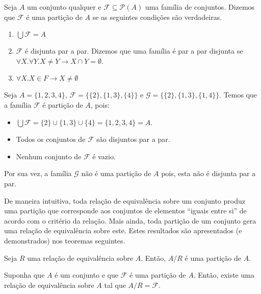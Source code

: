 \begin{Definition}[Partição]
Seja $A$ um conjunto qualquer e $\mathcal{F}\subseteq \mathcal{P}(A)$
uma família de conjuntos. Dizemos que $\mathcal{F}$ é uma partição de
$A$ se as seguintes condições são verdadeiras.
\begin{enumerate}
  \item $\bigcup\mathcal{F} = A$
  \item $\mathcal{F}$ é disjunta par a par. Dizemos que uma família é
    par a par disjunta se $\forall X. \forall Y. X \neq Y \to X \cap Y
    = \emptyset$.
  \item $\forall X. X\in F \to X \neq \emptyset$
\end{enumerate}
\end{Definition}
\begin{Example}
Seja $A = \{1,2,3,4\}$, $\mathcal{F} =\{\{2\},\{1,3\},\{4\}\}$ e
$\mathcal{G} =\{\{2\},\{1,3\},\{1,4\}\}$. Temos que a família
$\mathcal{F}$ é  partição de $A$, pois:
\begin{itemize}
  \item $\bigcup \mathcal{F} = \{2\} \cup \{1,3\} \cup \{4\} =
    \{1,2,3,4\} = A$.
  \item Todos os conjuntos de $\mathcal{F}$ são disjuntos par a par.
  \item Nenhum conjunto de $\mathcal{F}$ é vazio.
\end{itemize}
Por sua vez, a família $\mathcal{G}$ não é uma partição de $A$ pois,
esta não é disjunta par a par.
\end{Example}

De maneira intuitiva, toda relação de equivalência sobre um conjunto
produz uma partição que corresponde aos conjuntos de elementos
``iguais entre si'' de acordo com o critério da relação. Mais ainda,
toda partição de um conjunto gera uma relação de equivalência sobre
este. Estes resultados são apresentados (e demonstrados) nos teoremas
seguintes.

\begin{Theorem}
Seja $R$ uma relação de equivalência sobre $A$. Então, $A / R$ é uma
partição de $A$.
\end{Theorem}

\begin{Theorem}
Suponha que $A$ é um conjunto e que $\mathcal{F}$ é uma partição de
$A$. Então, existe uma relação de equivalência sobre $A$ tal que $A /
R = \mathcal{F}$.
\end{Theorem}